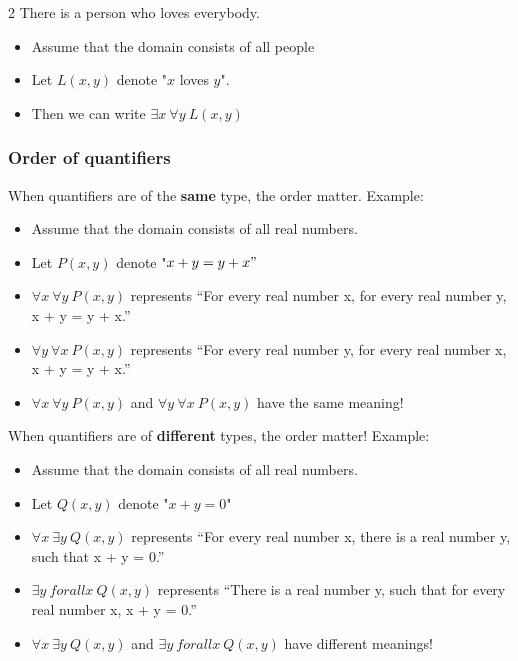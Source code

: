 \documentclass[12pt, letterpaper]{article}
\newcommand{\cul}[1]{%
		\uline{\phantom{#1}}%
		\llap{\contour{white}{#1}}%
	}
\newcommand{\exheader}[1][ex]{{\tiny{#1}\normalsize}}
\begin{document}
\bigbreak

\exheader[2] There is a person who loves everybody.
\begin{itemize}[leftmargin=0.5cm, label={}]
	\item Assume that the domain consists of all people
	\item Let $L(x,y)$ denote "$x$ loves $y$".
	\item Then we can write $\exists x \ \forall y \ L(x,y)$
\end{itemize}

\pagebreak


\subsubsection*{Order of quantifiers}
\bigbreak
When quantifiers are of the \textbf{same} type, the order \cul{doesn't} matter. \smallbreak
Example:
\begin{itemize}[leftmargin=0.8cm, label={\faAngleRight}]
	\item Assume that the domain consists of all real numbers.
	\item Let $P(x,y)$ denote "$x+y=y+x"$
	\item $\forall x \ \forall y \ P(x,y)$  represents “For every real number x, for every real number y, x + y = y + x.”
	\item $\forall y \ \forall x \ P(x,y)$  represents “For every real number y, for every real number x, x + y = y + x.”
	\item $\forall x \ \forall y \ P(x,y)$ and $\forall y \ \forall x \ P(x,y)$ have the same meaning!
\end{itemize}

\bigbreak
\bigbreak

When quantifiers are of \textbf{different} types, the order \cul{does} matter! \smallbreak
Example:
\begin{itemize}[leftmargin=0.8cm, label={\faAngleRight}]
	\item Assume that the domain consists of all real numbers.
	\item Let $Q(x,y)$ denote "$x + y = 0$"
	\item $\forall x \ \exists y \ Q(x,y)$  represents “For every real number x, there is a real number y, such that x + y = 0.”
	\item $\exists y \ forall x \ Q(x,y)$ represents “There is a real number y, such that for every real number x, x + y = 0.”
	\item $\forall x \ \exists y \ Q(x,y)$ and $\exists y \ forall x \ Q(x,y)$ have different meanings!
\end{itemize}
\end{document}
